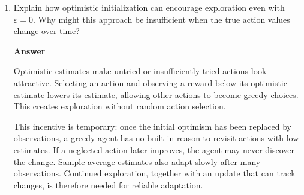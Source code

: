 \documentclass[11pt,a4paper]{article}
\newcommand{\answer}{\par\smallskip\textbf{Answer}\par}
\begin{document}
\begin{enumerate}
\item Explain how optimistic initialization can encourage exploration even with $\varepsilon=0$. Why might this approach be insufficient when the true action values change over time?
\answer
Optimistic estimates make untried or insufficiently tried actions look attractive. Selecting an action and observing a reward below its optimistic estimate lowers its estimate, allowing other actions to become greedy choices. This creates exploration without random action selection.

This incentive is temporary: once the initial optimism has been replaced by observations, a greedy agent has no built-in reason to revisit actions with low estimates. If a neglected action later improves, the agent may never discover the change. Sample-average estimates also adapt slowly after many observations. Continued exploration, together with an update that can track changes, is therefore needed for reliable adaptation.
\end{enumerate}
\end{document}

